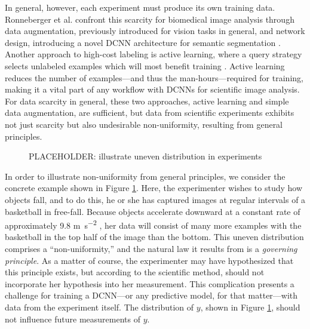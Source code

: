 \documentclass[10pt, draftcls]{IEEEtran}
\begin{document}
In general, however, each experiment must produce its own training
data. Ronneberger et al. confront this scarcity for biomedical image analysis
through data augmentation, previously introduced for vision tasks in general,
and network design, introducing a novel DCNN architecture for semantic
segmentation \cite{krizhevsky_imagenet_2012, ronneberger_u-net:_2015}. Another
approach to high-cost labeling is active learning, where a query strategy
selects unlabeled examples which will most benefit training
\cite{settles_active_2012}. Active learning reduces the number of examples---and
thus the man-hours---required for training, making it a vital part of any
workflow with DCNNs for scientific image analysis. For data scarcity in general,
these two approaches, active learning and simple data augmentation, are
sufficient, but data from scientific experiments exhibits not just scarcity but
also undesirable non-uniformity, resulting from general principles.

\begin{figure}
  \centering
  \caption{PLACEHOLDER: illustrate uneven distribution in experiments}
  \label{fig:free-fall}
\end{figure}

In order to illustrate non-uniformity from general principles, we consider the
concrete example shown in Figure \ref{fig:free-fall}. Here, the experimenter
wishes to study how objects fall, and to do this, he or she has captured images
at regular intervals of a basketball in free-fall. Because objects accelerate
downward at a constant rate of approximately 9.8 \si{\meter\per\second^2}
\cite{munroe_wikipedian_nodate}, her data will consist of many more examples
with the basketball in the top half of the image than the bottom. This uneven
distribution comprises a ``non-uniformity,'' and the natural law it results from
is a \emph{governing principle}. As a matter of course, the experimenter may
have hypothesized that this principle exists, but according to the scientific
method, should not incorporate her hypothesis into her measurement. This
complication presents a challenge for training a DCNN---or any predictive model,
for that matter---with data from the experiment itself. The distribution of $y$,
shown in Figure \ref{fig:free-fall}, should not influence future measurements of
$y$.

\end{document}
